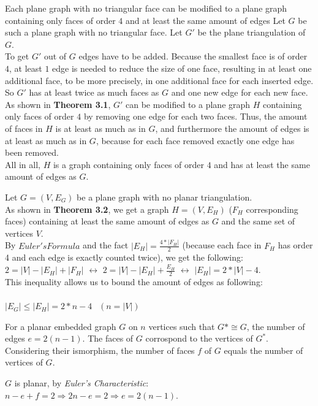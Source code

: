 \documentclass[a4paper]{article}
\begin{document}
\begin{solution}{19}
			\begin{theorem} {Each plane graph with no triangular face can be modified to a plane graph containing only faces of order $4$ and at least the same amount of edges}
				Let $G$ be such a plane graph with no triangular face. Let $G'$ be the plane triangulation of $G$.\\
				To get $G'$ out of $G$ edges have to be added. Because the smallest face is of order $4$, at least $1$ edge is needed to
				reduce the size of one face, resulting in at least one additional face, to be more precisely, in one additional face for each inserted edge. So $G'$ has at least twice as much faces as $G$ and one new edge for each new face. As shown in \textbf{Theorem 3.1}, $G'$ can be modified to a plane graph $H$ containing only faces of order $4$ by removing one edge for each two faces. Thus, the amount of faces in $H$ is at least as much as in $G$, and furthermore the amount of edges is at least as much as in $G$, because for each face removed exactly one edge has been removed.\\
				All in all, $H$ is a graph containing only faces of order $4$ and has at least the same amount of edges as $G$.
			\end{theorem}		
			
	
			Let $G=(V,E_G)$ be a plane graph with no planar triangulation.\\
			As shown in \textbf{Theorem 3.2}, we get a graph $H=(V,E_H)$ ($F_H$ corresponding faces) containing at least the same amount of edges as $G$ and the same set of vertices $V$.\\
			
			By $Euler's Formula$ and the fact $|E_H|= \frac{4 * |F_H|}{2}$ (because each face in $F_H$ has order 4 and each edge is exactly counted twice), we get the following:\\
			$2 = |V| - |E_H| +|F_H|$ $\leftrightarrow$ $2 = |V| - |E_H| + \frac{E_H}{2}$ $\leftrightarrow$ $|E_H| = 2 * |V| - 4$.\\
			This inequality allows us to bound the amount of edges as following:\\\\
			$|E_G| \leq |E_H| = 2 * n - 4$   $~~(n=|V|)$
	\end{solution}
	\newpage
	\begin{solution}{20}
		\begin{theorem}{For a planar embedded graph $G$ on $n$ vertices such that $G* \cong G$, the number of edges $e = 2(n - 1)$.}
			The faces of $G$ corrospond to the vertices of $G^*$. Considering their ismorphism, the number of faces $f$ of $G$ equals the number of vertices of $G$.
			
			$G$ is planar, by \emph{Euler's Characteristic}: $n - e + f = 2 \Rightarrow 2n - e = 2 \Rightarrow e = 2(n-1)$.
		\end{theorem}
	\end{solution}
	
\end{document}
